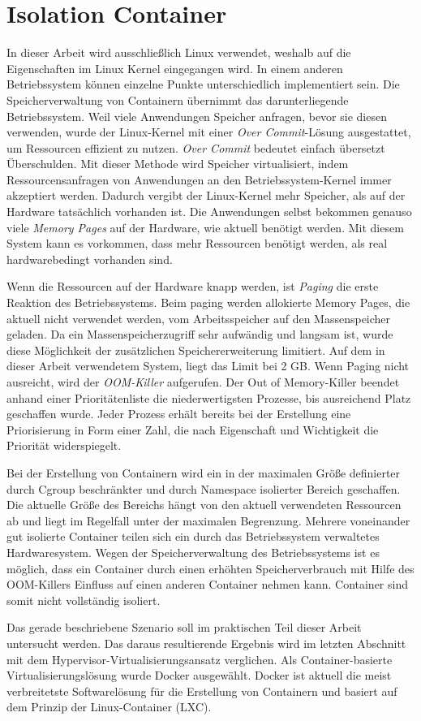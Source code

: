 \thispagestyle{empty}
\section{Isolation Container}

In dieser Arbeit wird ausschließlich Linux verwendet, weshalb auf die Eigenschaften im Linux Kernel eingegangen wird. In einem anderen Betriebssystem können einzelne Punkte unterschiedlich implementiert sein. Die Speicherverwaltung von Containern übernimmt das darunterliegende Betriebssystem. Weil viele Anwendungen Speicher anfragen, bevor sie diesen verwenden, wurde der Linux-Kernel mit einer \emph{Over Commit}-Lösung ausgestattet, um Ressourcen effizient zu nutzen. \emph{Over Commit} bedeutet einfach übersetzt Überschulden. Mit dieser Methode wird Speicher virtualisiert, indem Ressourcensanfragen von Anwendungen an den Betriebssystem-Kernel immer akzeptiert werden. Dadurch vergibt der Linux-Kernel mehr Speicher, als auf der Hardware tatsächlich vorhanden ist. Die Anwendungen selbst bekommen genauso viele \emph{Memory Pages} auf der Hardware, wie aktuell benötigt werden. Mit diesem System kann es vorkommen, dass mehr Ressourcen benötigt werden, als real hardwarebedingt vorhanden sind. 

Wenn die Ressourcen auf der Hardware knapp werden, ist \emph{Paging} die erste Reaktion des Betriebssystems. Beim paging werden allokierte Memory Pages, die aktuell nicht verwendet werden, vom Arbeitsspeicher auf den Massenspeicher geladen. Da ein Massenspeicherzugriff sehr aufwändig und langsam ist, wurde diese Möglichkeit der zusätzlichen Speichererweiterung limitiert. Auf dem in dieser Arbeit verwendetem System, liegt das Limit bei 2 GB. Wenn Paging nicht ausreicht, wird der \emph{OOM-Killer} aufgerufen. Der Out of Memory-Killer beendet anhand einer Prioritätenliste die niederwertigsten Prozesse, bis ausreichend Platz geschaffen wurde. Jeder Prozess erhält bereits bei der Erstellung eine Priorisierung in Form einer Zahl, die nach Eigenschaft und Wichtigkeit die Priorität widerspiegelt.

Bei der Erstellung von Containern wird ein in der maximalen Größe definierter durch Cgroup beschränkter und durch Namespace isolierter Bereich geschaffen. Die aktuelle Größe des Bereichs hängt von den aktuell verwendeten Ressourcen ab und liegt im Regelfall unter der maximalen Begrenzung. Mehrere voneinander gut isolierte Container teilen sich ein durch das Betriebssystem verwaltetes Hardwaresystem. Wegen der Speicherverwaltung des Betriebssystems ist es möglich, dass ein Container durch einen erhöhten Speicherverbrauch mit Hilfe des OOM-Killers Einfluss auf einen anderen Container nehmen kann. Container sind somit nicht vollständig isoliert.

Das gerade beschriebene Szenario soll im praktischen Teil dieser Arbeit untersucht werden. Das daraus resultierende Ergebnis wird im letzten Abschnitt mit dem Hypervisor-Virtualisierungsansatz verglichen. Als Container-basierte Virtualisierungslösung wurde Docker ausgewählt. Docker ist aktuell die meist verbreitetste Softwarelösung für die Erstellung von Containern und basiert auf dem Prinzip der Linux-Container (LXC).





